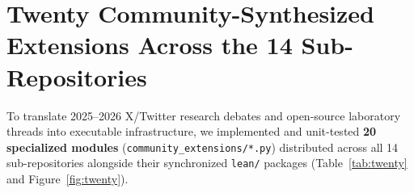 \documentclass[10pt,letterpaper]{article}
\begin{document}
\section{Twenty Community-Synthesized Extensions Across the 14 Sub-Repositories}
\label{sec:twenty}

To translate 2025--2026 X/Twitter research debates and open-source laboratory threads into executable infrastructure, we implemented and unit-tested \textbf{20 specialized modules} (\texttt{community\_extensions/*.py}) distributed across all 14 sub-repositories alongside their synchronized \texttt{lean/} packages (Table~\ref{tab:twenty} and Figure~\ref{fig:twenty}).
\end{document}
